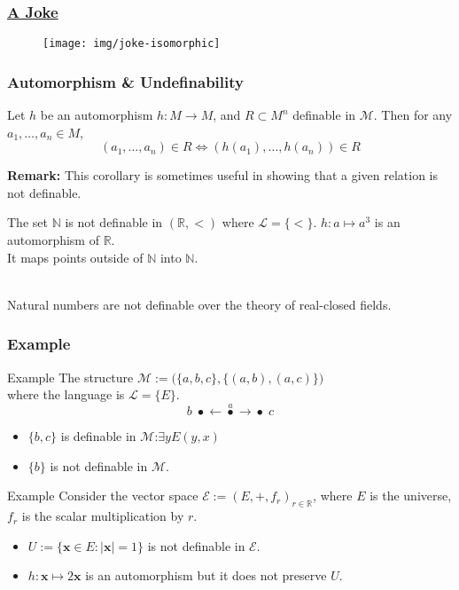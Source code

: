 \documentclass[UTF8,aspectratio=43,11pt,colorlinks,compress,openany]{beamer}%
\begin{document}
\begin{frame}\frametitle{\href{https://mathoverflow.net/questions/53122/mathematical-urban-legends}{A Joke}}
	\begin{figure}
	\texttt{[image: img/joke-isomorphic]}
	\end{figure}
\end{frame}

\begin{frame}\frametitle{Automorphism \& Undefinability}
	\begin{corollary}
		Let $h$ be an automorphism $h: M\to M$, and $R\subset M^n$ definable in $\mathcal{M}$. Then for any $a_1,\dots,a_n\in M$,
		\[(a_1,\dots,a_n)\in R\iff(h(a_1),\dots,h(a_n))\in R\]
	\end{corollary}
	\textbf{Remark:} This corollary is sometimes useful in showing that a given relation is not definable.
	\begin{block}{The set $\mathbb{N}$ is not definable in $(\mathbb{R},<)$ where $\mathscr{L}=\{<\}$.}
		$h: a\mapsto a^3$ is an automorphism of $\mathbb{R}$.\\
		It maps points outside of $\mathbb{N}$ into $\mathbb{N}$.
	\end{block}
	\begin{center}
		\\
		Natural numbers are not definable over the theory of real-closed fields.
	\end{center}
\end{frame}

\begin{frame}\frametitle{Example}
\setlength\belowdisplayskip{0pt}
\begin{block}{Example}
	The structure $\mathcal{M}:=\big(\{a,b,c\},\{(a,b),(a,c)\}\big)$\\
	where the language is $\mathscr{L}=\{E\}$.
	\[b\;\bullet\mathbf{\leftarrow}\stackrel{a}{\bullet}\mathbf{\to}\bullet\;c\]
	\begin{itemize}
		\item $\{b,c\}$ is definable in $\mathcal{M}$:\quad $\exists y E(y,x)$
		\item $\{b\}$ is not definable in $\mathcal{M}$.
	\end{itemize}
\end{block}
\begin{block}{Example}
Consider the vector space $\mathcal{E}:=(E,+,f_r)_{r\in\mathbb{R}}$, where $E$ is the universe, $f_r$ is the scalar multiplication by $r$.
\begin{itemize}
	\item $U:=\{\mathbf{x}\in E: |\mathbf{x}|=1\}$ is not definable in $\mathcal{E}$.
	\item $h:\mathbf{x}\mapsto 2\mathbf{x}$ is an automorphism but it does not preserve $U$.
\end{itemize}
\end{block}
\end{frame}
\end{document}
